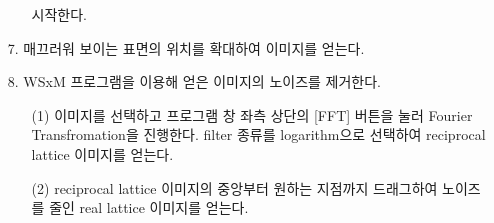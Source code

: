 \documentclass[aps,reprint,superscriptaddress,11pt]{revtex4-2}
\begin{document}
\begin{itemize}
\begin{itemize}
    시작한다.
  \end{itemize}
  \item[7. ] 매끄러워 보이는 표면의 위치를 확대하여 이미지를 얻는다.
  \item[8. ] WSxM 프로그램을 이용해 얻은 이미지의 노이즈를 제거한다.
  \begin{itemize}
    \item[(1)] 이미지를 선택하고 프로그램 창 좌측 상단의 [FFT] 버튼을 눌러 Fourier 
    Transfromation을 진행한다. filter 종류를 logarithm으로 선택하여 reciprocal lattice 
    이미지를 얻는다.
    \item[(2)]  reciprocal lattice 이미지의 중앙부터 원하는 지점까지 드래그하여 
    노이즈를 줄인 real lattice 이미지를 얻는다.
  \end{itemize}
\end{itemize}
\end{document}
